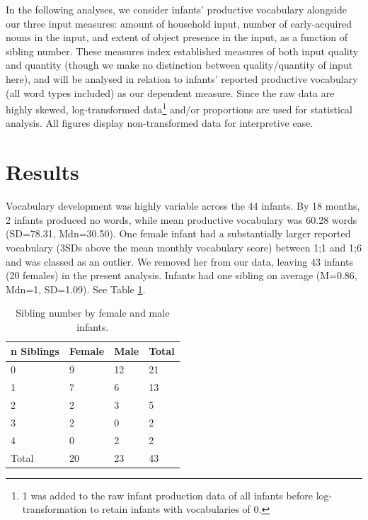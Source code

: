 \documentclass[
  english,
  man,floatsintext]{apa6}
\begin{document}
In the following analyses, we consider infants' productive vocabulary alongside our three input measures: amount of household input, number of early-acquired nouns in the input, and extent of object presence in the input, as a function of sibling number. These measures index established measures of both input quality and quantity (though we make no distinction between quality/quantity of input here), and will be analysed in relation to infants' reported productive vocabulary (all word types included) as our dependent measure. Since the raw data are highly skewed, log-transformed data\footnote{1 was added to the raw infant production data of all infants before log-transformation to retain infants with vocabularies of 0.} and/or proportions are used for statistical analysis. All figures display non-transformed data for interpretive ease.

\hypertarget{results}{%
\section{Results}\label{results}}

Vocabulary development was highly variable across the 44 infants. By 18 months, 2 infants produced no words, while mean productive vocabulary was 60.28 words (SD=78.31, Mdn=30.50). One female infant had a substantially larger reported vocabulary (3SDs above the mean monthly vocabulary score) between 1;1 and 1;6 and was classed as an outlier. We removed her from our data, leaving 43 infants (20 females) in the present analysis. Infants had one sibling on average (M=0.86, Mdn=1, SD=1.09). See Table \ref{tab:table-sibling-number}.

\begin{table}[H]

\begin{center}
\begin{threeparttable}

\caption{\label{tab:table-sibling-number}Sibling number by female and male infants.}

\small{

\begin{tabular}{llll}
\toprule
n Siblings & \multicolumn{1}{c}{Female} & \multicolumn{1}{c}{Male} & \multicolumn{1}{c}{Total}\\
\midrule
0 & 9 & 12 & 21\\
1 & 7 & 6 & 13\\
2 & 2 & 3 & 5\\
3 & 2 & 0 & 2\\
4 & 0 & 2 & 2\\
Total & 20 & 23 & 43\\
\bottomrule
\end{tabular}

}

\end{threeparttable}
\end{center}

\end{table}
\end{document}
